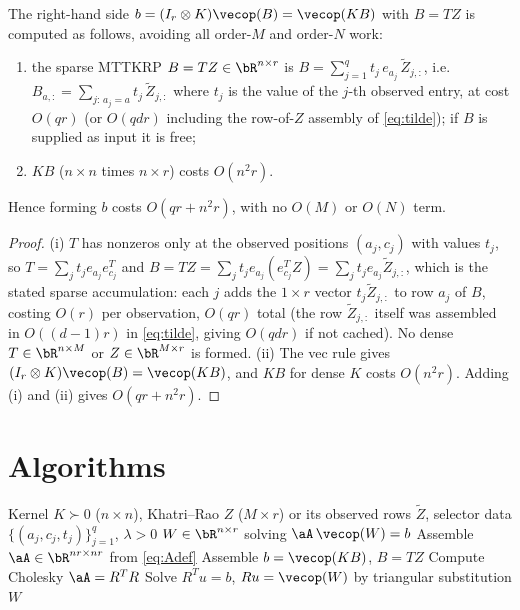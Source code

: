 \begin{lemma}\label{lem:rhs}
The right-hand side $b=(I_r\otimes K)\vecop(B)=\vecop(KB)$ with $B=TZ$ is
computed as follows, avoiding all order-$M$ and order-$N$ work:
\begin{enumerate}[label=\textup{(\roman*)}]
\item the sparse MTTKRP $B=TZ\in\bR^{n\times r}$ is
      $B=\sum_{j=1}^{q}t_j\,e_{a_j}\,\tilde Z_{j,:}$, i.e.\
      $B_{a,:}=\sum_{j:\,a_j=a} t_j\,\tilde Z_{j,:}$ where $t_j$ is the value of
      the $j$-th observed entry, at cost $O(qr)$ (or $O(qdr)$ including the
      row-of-$Z$ assembly of \eqref{eq:tilde}); if $B$ is supplied as input it
      is free;
\item $KB$ ($n\times n$ times $n\times r$) costs $O(n^{2}r)$.
\end{enumerate}
Hence forming $b$ costs $O(qr+n^{2}r)$, with no $O(M)$ or $O(N)$ term.
\end{lemma}

\begin{proof}
(i) $T$ has nonzeros only at the observed positions $(a_j,c_j)$ with values
$t_j$, so $T=\sum_j t_j e_{a_j}e_{c_j}^{T}$ and
$B=TZ=\sum_j t_j e_{a_j}(e_{c_j}^{T}Z)=\sum_j t_j e_{a_j}\tilde Z_{j,:}$,
which is the stated sparse accumulation: each $j$ adds the $1\times r$ vector
$t_j\tilde Z_{j,:}$ to row $a_j$ of $B$, costing $O(r)$ per observation, $O(qr)$
total (the row $\tilde Z_{j,:}$ itself was assembled in $O((d-1)r)$ in
\eqref{eq:tilde}, giving $O(qdr)$ if not cached). No dense $T\in\bR^{n\times M}$
or $Z\in\bR^{M\times r}$ is formed. (ii) The vec rule gives
$(I_r\otimes K)\vecop(B)=\vecop(KB)$, and $KB$ for dense $K$ costs $O(n^{2}r)$.
Adding (i) and (ii) gives $O(qr+n^{2}r)$.
\end{proof}

\section*{Algorithms}

\begin{algorithm}[h]
\caption{Direct symmetric solve of the mode-$k$ subproblem}
\label{alg:direct}
\begin{algorithmic}[1]
\Require Kernel $K\succ0$ ($n\times n$), Khatri--Rao $Z$ ($M\times r$) or its
  observed rows $\tilde Z$, selector data $\{(a_j,c_j,t_j)\}_{j=1}^q$, $\lambda>0$
\Ensure $W\in\bR^{n\times r}$ solving $\aA\,\vecop(W)=b$
\State Assemble $\aA\in\bR^{nr\times nr}$ from \eqref{eq:Adef}
\State Assemble $b=\vecop(KB)$, $B=TZ$ 
\State Compute Cholesky $\aA=R^{T}R$ \Comment{$O((nr)^3)=O(n^3r^3)$}
\State Solve $R^{T}u=b$, $Ru=\vecop(W)$ by triangular substitution
  \Comment{$O(n^2r^2)$}
\State \Return $W$
\end{algorithmic}
\end{algorithm}

